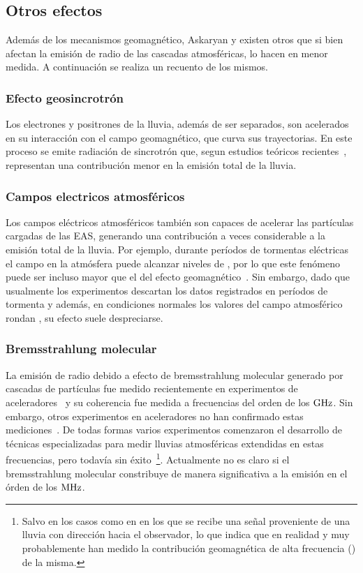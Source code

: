 \subsection{Otros efectos}
\label{sbsc:other_emision}
	
	Adem\'as de los mecanismos geomagn\'etico, Askaryan y \cher{} existen otros que si bien afectan la emisi\'on de radio de las cascadas atmosf\'ericas, lo hacen en menor medida. 
	A continuaci\'on se realiza un recuento de los mismos.
	
	\subsubsection{Efecto geosincrotr\'on}
	Los electrones y positrones de la lluvia, adem\'as de ser separados, son acelerados en su interacci\'on con el campo geomagn\'etico, que curva sus trayectorias.
	En este proceso se emite radiaci\'on de sincrotr\'on que, segun estudios te\'oricos recientes~\cite{geosintrotron}, representan una contribuci\'on menor en la emisi\'on total de la lluvia.
	
	\subsubsection{Campos electricos atmosf\'ericos}
	Los campos el\'ectricos atmosf\'ericos tambi\'en son capaces de acelerar las part\'iculas cargadas de las EAS, generando una contribuci\'on a veces considerable a la emisi\'on total de la lluvia. 
	Por ejemplo, durante per\'iodos de tormentas el\'ectricas el campo en la atm\'osfera puede alcanzar niveles de , por lo que este fen\'omeno puede ser incluso mayor que el del efecto geomagn\'etico~\cite{atmosphericField}.
	Sin embargo, dado que usualmente los experimentos descartan los datos registrados en per\'iodos de tormenta y adem\'as, en condiciones normales los valores del campo atmosf\'erico rondan , su efecto suele despreciarse.
	
	
	\subsubsection{Bremsstrahlung molecular}
	
	La emisi\'on de radio debido a efecto de bremsstrahlung molecular generado por cascadas de part\'iculas fue medido recientemente en experimentos de aceleradores~\cite{bremsstrahlungMolec} y su coherencia fue medida a frecuencias del orden de los $\rm GHz$.
	Sin embargo, otros experimentos en aceleradores no han confirmado estas mediciones~\cite{cite:AMY}.
	De todas formas varios experimentos comenzaron el desarrollo de t\'ecnicas especializadas para medir lluvias atmosf\'ericas extendidas en estas frecuencias, pero todav\'ia sin \'exito~\cite{cite:midas}\footnote{Salvo en los casos como en \cite{cite:CHROME} en los que se recibe una se\~nal proveniente de una lluvia con direcci\'on hacia el observador, lo que indica que en realidad y muy probablemente han medido la contribuci\'on geomagn\'etica de alta frecuencia () de la misma.}.
	Actualmente no es claro si el bremsstrahlung molecular constribuye de manera significativa a la emisi\'on en el \'orden de los $\rm MHz$.
	
